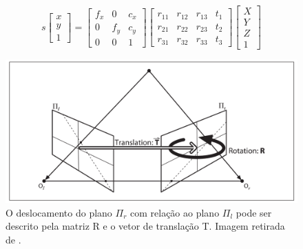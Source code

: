 \begin{equation}
\label{projection_equation}
s
\begin{bmatrix}
x \\ 
y \\ 
1 
\end{bmatrix}
= 
\begin{bmatrix}
f_x & 0 & c_x\\ 
0 & f_y & c_y\\ 
0 & 0 & 1
\end{bmatrix} 
\begin{bmatrix}
r_{11} & r_{12} & r_{13} & t_1 \\ 
r_{21} & r_{22} & r_{23} & t_2 \\ 
r_{31} & r_{32} & r_{33} & t_3
\end{bmatrix}
\begin{bmatrix}
X \\ 
Y \\ 
Z \\ 
1
\end{bmatrix}
\end{equation}

\begin{figure}[H]
 	\centering
 	\includegraphics[scale=0.25]{./Resources/bradski/essential_geometry.png}
 	\caption{O deslocamento do plano $\Pi_r$ com relação ao plano $\Pi_l$ pode ser descrito pela matriz R e o vetor de translação T. Imagem retirada de \cite{Bradski2008}.}
 	\label{essential_geometry.png}
\end{figure}


